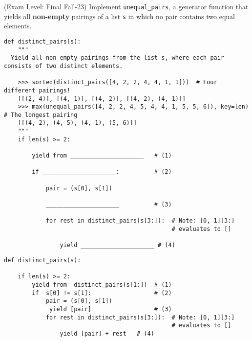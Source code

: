 \begin{blocksection}
\question(Exam Level: Final Fall-23) Implement \texttt{unequal\_pairs}, a generator function that yields all \textbf{non-empty} pairings of a list \texttt{s} in which no pair contains two equal elements.

\begin{lstlisting}
def distinct_pairs(s):
    """
  Yield all non-empty pairings from the list s, where each pair consists of two distinct elements.

    >>> sorted(distinct_pairs([4, 2, 2, 4, 4, 1, 1]))  # Four different pairings!
    [[(2, 4)], [(4, 1)], [(4, 2)], [(4, 2), (4, 1)]]
    >>> max(unequal_pairs([4, 2, 2, 4, 5, 4, 4, 1, 5, 5, 6]), key=len)  # The longest pairing
    [[(4, 2), (4, 5), (4, 1), (5, 6)]]
    """
    if len(s) >= 2:

        yield from _____________________   # (1)

        if _____________________:          # (2)

            pair = (s[0], s[1])

            _____________________          # (3)

            for rest in distinct_pairs(s[3:]):  # Note: [0, 1][3:]  
                                                # evaluates to []

                yield _____________________ # (4)
\end{lstlisting}

\end{blocksection}

\begin{blocksection}
\begin{solution}[0in]

\begin{lstlisting}
def distinct_pairs(s):
 
    if len(s) >= 2:
        yield from  distinct_pairs(s[1:])  # (1)
        if  s[0] != s[1]:                  # (2)
            pair = (s[0], s[1])
             yield [pair]                  # (3)
            for rest in distinct_pairs(s[3:]):  # Note: [0, 1][3:]  
                                                # evaluates to []
                yield [pair] + rest   # (4)
\end{lstlisting}

\end{solution}
\end{blocksection}